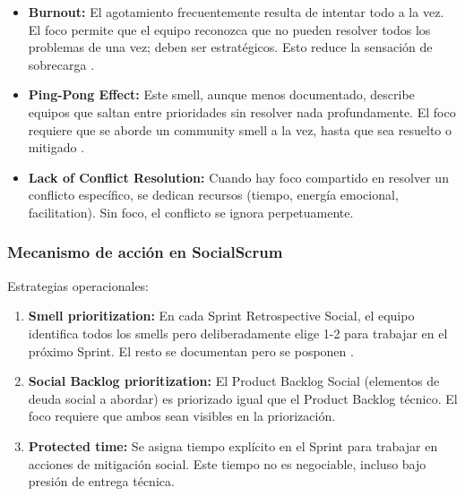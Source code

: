 \begin{itemize}

\item \textbf{Burnout:} El agotamiento frecuentemente resulta de intentar todo a la vez. El foco permite que el equipo reconozca que no pueden resolver todos los problemas de una vez; deben ser estratégicos. Esto reduce la sensación de sobrecarga \cite{tulili2022burnout}.

\item \textbf{Ping-Pong Effect:} Este smell, aunque menos documentado, describe equipos que saltan entre prioridades sin resolver nada profundamente. El foco requiere que se aborde un community smell a la vez, hasta que sea resuelto o mitigado \cite{caballero2022communitysmells}.

\item \textbf{Lack of Conflict Resolution:} Cuando hay foco compartido en resolver un conflicto específico, se dedican recursos (tiempo, energía emocional, facilitation). Sin foco, el conflicto se ignora perpetuamente.

\end{itemize}

\subsubsection*{Mecanismo de acción en SocialScrum}

Estrategias operacionales:
\begin{enumerate}
\item \textbf{Smell prioritization:} En cada Sprint Retrospective Social, el equipo identifica todos los smells pero deliberadamente elige 1-2 para trabajar en el próximo Sprint. El resto se documentan pero se posponen \cite{saeeda2024nontechnicaldebt}.
\item \textbf{Social Backlog prioritization:} El Product Backlog Social (elementos de deuda social a abordar) es priorizado igual que el Product Backlog técnico. El foco requiere que ambos sean visibles en la priorización.
\item \textbf{Protected time:} Se asigna tiempo explícito en el Sprint para trabajar en acciones de mitigación social. Este tiempo no es negociable, incluso bajo presión de entrega técnica.
\end{enumerate}


